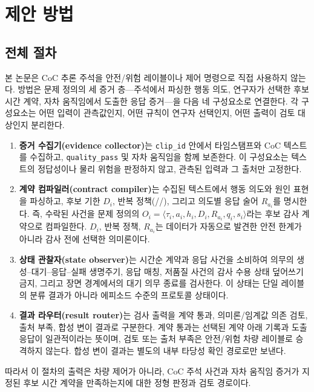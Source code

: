 \section{제안 방법}
\label{sec:method}

\subsection{전체 절차}
본 논문은 CoC 추론 주석을 안전/위험 레이블이나 제어 명령으로 직접 사용하지 않는다. 방법은 문제 정의의 세 증거 층---주석에서 파싱한 행동 의도, 연구자가 선택한 후보 시간 계약, 자차 움직임에서 도출한 응답 증거---을 다음 네 구성요소로 연결한다. 각 구성요소는 어떤 입력이 관측값인지, 어떤 규칙이 연구자 선택인지, 어떤 출력이 검토 대상인지 분리한다.

\begin{enumerate}
\item \textbf{증거 수집기(evidence collector)}는 \texttt{clip\_id} 안에서 타임스탬프와 CoC 텍스트를 수집하고, \texttt{quality\_pass} 및 자차 움직임을 함께 보존한다. 이 구성요소는 텍스트의 정답성이나 물리 위험을 판정하지 않고, 관측된 입력과 그 출처만 고정한다.
\item \textbf{계약 컴파일러(contract compiler)}는 수집된 텍스트에서 행동 의도와 원인 표현을 파싱하고, 후보 기한 $D_i$, 반복 정책(\preserve/\reset/\dedup), 그리고 의도별 응답 술어 $R_{a_i}$를 명시한다. 즉, 수락된 사건을 문제 정의의 $O_i=\langle\tau_i,a_i,h_i,D_i,R_{a_i},q_i,s_i\rangle$라는 후보 감사 계약으로 컴파일한다. $D_i$, 반복 정책, $R_{a_i}$는 데이터가 자동으로 발견한 안전 한계가 아니라 감사 전에 선택한 의미론이다.
\item \textbf{상태 관찰자(state observer)}는 시간순 계약과 응답 사건을 소비하여 의무의 생성--대기--응답--실패 생명주기, 응답 매칭, 저품질 사건의 감사 수용 상태 덮어쓰기 금지, 그리고 장면 경계에서의 대기 의무 종료를 검사한다. 이 상태는 단일 레이블의 분류 결과가 아니라 에피소드 수준의 프로토콜 상태이다.
\item \textbf{결과 라우터(result router)}는 검사 출력을 계약 통과, 의미론/임계값 의존 검토, 출처 부족, 합성 변이 결과로 구분한다. 계약 통과는 선택된 계약 아래 기록과 도출 응답이 일관적이라는 뜻이며, 검토 또는 출처 부족은 안전/위험 차량 레이블로 승격하지 않는다. 합성 변이 결과는 별도의 내부 타당성 확인 경로로만 보낸다.
\end{enumerate}

따라서 이 절차의 출력은 차량 제어가 아니라, CoC 주석 사건과 자차 움직임 증거가 지정된 후보 시간 계약을 만족하는지에 대한 정형 판정과 검토 경로이다.

